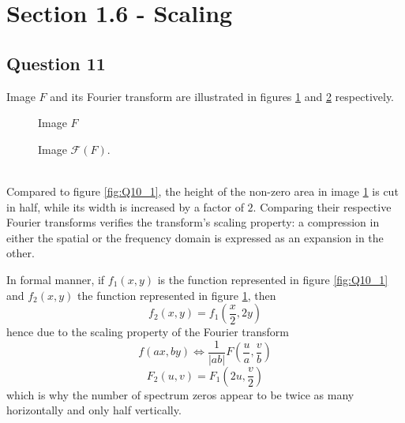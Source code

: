 \section{Section 1.6 - Scaling}

\subsection{Question 11}

Image $F$ and its Fourier transform are illustrated in figures \ref{fig:Q11_1} and \ref{fig:Q11_2} respectively.

\begin{minipage}{\linewidth}
  \centering
  \begin{minipage}{0.4\linewidth}
    \begin{figure}[H]
      \scalebox{0.6}{}
      \caption{Image $F$}
      \label{fig:Q11_1}
    \end{figure}
  \end{minipage}
  \hspace{0.05\linewidth}
  \begin{minipage}{0.4\linewidth}
    \begin{figure}[H]
      \scalebox{0.6}{}
      \caption{Image $\mathcal{F}(F)$.}
      \label{fig:Q11_2}
    \end{figure}
  \end{minipage}
\end{minipage}
\\

Compared to figure \ref{fig:Q10_1}, the height of the non-zero area in image \ref{fig:Q11_1} is cut in half, while its width is increased by a factor of $2$.
Comparing their respective Fourier transforms verifies the transform's scaling property: a compression in either the spatial or the frequency domain is expressed
as an expansion in the other.

In formal manner, if $f_1(x,y)$ is the function represented in figure \ref{fig:Q10_1} and $f_2(x,y)$ the function represented in figure \ref{fig:Q11_1},
then $$f_2(x,y) = f_1(\frac{x}{2}, 2y)$$ hence due to the scaling property of the Fourier transform $$f(ax,by) \Longleftrightarrow \dfrac{1}{|ab|}F(\frac{u}{a}, \frac{v}{b})$$ $$F_2(u,v) = F_1(2u, \frac{v}{2})$$ which is why the number of spectrum zeros appear to be twice as many horizontally and only half vertically.